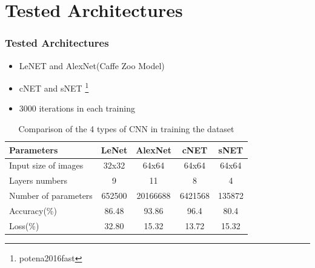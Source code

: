 \documentclass[10pt,a4paper]{beamer}
\begin{document}
\section{Tested Architectures}
\begin{frame}
\frametitle{Tested Architectures}
\begin{itemize}
	\item LeNET and AlexNet(Caffe Zoo Model) \
	\item cNET and sNET \footnote{potena2016fast}
	\item 3000 iterations in each training
\end{itemize}
\begin{table}[h!]
\centering
\renewcommand{\arraystretch}{1.2}
\caption{Comparison of the 4 types of CNN in training the dataset}
\label{table:2}
\begin{tabular}{|l c c c c|} 
 \hline
 \textbf{Parameters }& \textbf{LeNet} & \textbf{AlexNet} & \textbf{cNET} & \textbf{sNET} \\ [0.75ex] 
 \hline
 Input size of images & 32x32 & 64x64 & 64x64 & 64x64 \\ 
 Layers numbers & 9 & 11 & 8 & 4\\
 Number of parameters & 652500 & 20166688 & 6421568 & 135872 \\ 
 Accuracy(\%) & 86.48 & 93.86 & 96.4 & 80.4 \\
 Loss(\%) & 32.80 & 15.32 & 13.72 & 15.32 \\ [1ex] 
 \hline 
\end{tabular}
\end{table}
\end{frame}
\end{document}
